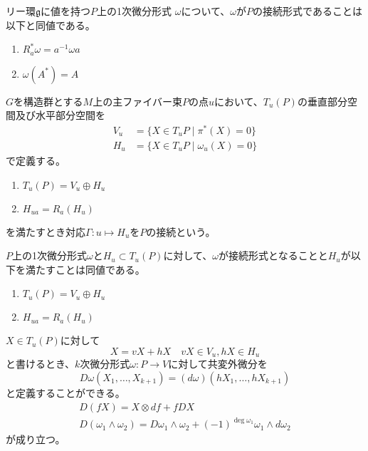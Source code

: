     \begin{thm}
        リー環$\mathfrak{g}$に値を持つ$P$上の1次微分形式
        $\omega$について、$\omega$が$P$の接続形式であることは以下と同値である。
        \begin{enumerate}
            \item $R_a^*\omega = a^{-1}\omega a$
            \item $\omega(A^*) = A$
        \end{enumerate}
    \end{thm}

    \begin{dfn}[接続]
        $G$を構造群とする$M$上の主ファイバー束$P$の点$u$において、$T_u(P)$の垂直部分空間及び水平部分空間を
        \begin{align*}
            V_u &= \{X \in T_uP \mid \pi^*(X) = 0\}\\
            H_u &= \{X \in T_uP \mid \omega_u(X) = 0\}
        \end{align*}
        で定義する。
        \begin{enumerate}
            \item $T_u(P) = V_u \oplus H_u$
            \item $H_{ua} = R_a(H_u)$
        \end{enumerate}
        を満たすとき対応$\Gamma: u \mapsto H_u$を$P$の接続という。
    \end{dfn}

    $P$上の1次微分形式$\omega$と$H_u \subset T_u(P)$に対して、$\omega$が接続形式となることと$H_u$が以下を満たすことは同値である。
    \begin{enumerate}
        \item $T_u(P) = V_u \oplus H_u$
        \item $H_{ua} = R_a(H_u)$
    \end{enumerate}

    $X \in T_u(P)$に対して
        \[X = vX + hX \quad vX \in V_u, hX \in H_u\]
    と書けるとき、$k$次微分形式$\omega: P \rightarrow V$に対して共変外微分を
        \[D\omega(X_1, \dots, X_{k+1}) = (d\omega)(hX_1, \dots, hX_{k+1})\]
    と定義することができる。
    \begin{gather*}
        D(fX) = X \otimes df + f DX\\
        D(\omega_1 \wedge \omega_2) = D\omega_1 \wedge \omega_2 + (-1)^{\deg\omega_1}\omega_1 \wedge d\omega_2
    \end{gather*}
    が成り立つ。


